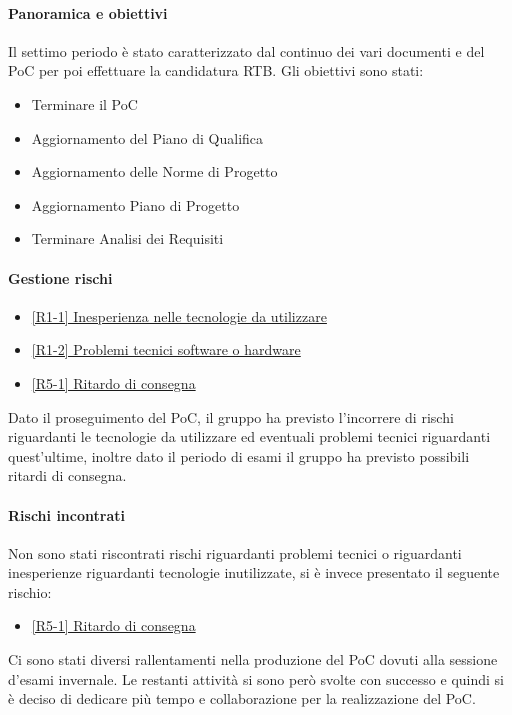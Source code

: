\documentclass[a4paper,12pt]{article}
\begin{document}
            \paragraph{Panoramica e obiettivi}
            Il settimo periodo è stato caratterizzato dal continuo dei vari documenti e del PoC per poi effettuare la candidatura RTB. Gli obiettivi sono stati:
            \begin{itemize}
                \item Terminare il PoC
                \item Aggiornamento del Piano di Qualifica
                \item Aggiornamento delle Norme di Progetto
                \item Aggiornamento Piano di Progetto
                \item Terminare Analisi dei Requisiti
            \end{itemize}
            
            \paragraph{Gestione rischi}
                \begin{itemize}
                \item\hyperref[tab:r1]{[R1-1] Inesperienza nelle tecnologie da utilizzare}
                \item\hyperref[tab:r1]{[R1-2] Problemi tecnici software o hardware}
                \item\hyperref[tab:r5]{[R5-1] Ritardo di consegna}
                \end{itemize}
                Dato il proseguimento del PoC, il gruppo ha previsto l'incorrere di rischi riguardanti le tecnologie da utilizzare ed eventuali problemi tecnici riguardanti quest'ultime, inoltre dato il periodo di esami il gruppo ha previsto possibili ritardi di consegna.
    
                \paragraph*{Rischi incontrati}
                Non sono stati riscontrati rischi riguardanti problemi tecnici o riguardanti inesperienze riguardanti tecnologie inutilizzate, si è invece presentato il seguente rischio:
                \\
                \begin{itemize}
                    \item \hyperref[tab:r5]{[R5-1] Ritardo di consegna}
                \end{itemize}
                Ci sono stati diversi rallentamenti nella produzione del PoC dovuti alla sessione d'esami invernale. Le restanti attività si sono però svolte con successo e quindi si è deciso di dedicare più tempo e collaborazione per la realizzazione del PoC.
                
\end{document}
